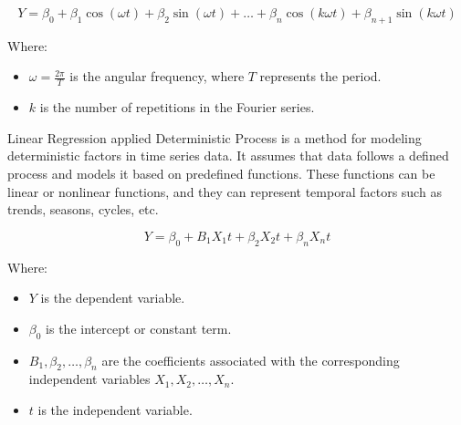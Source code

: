 \documentclass[conference]{IEEEtran}
\begin{document}
\[Y = \beta_0 + \beta_1 \cos(\omega t) + \beta_2 \sin(\omega t) + \ldots + \beta_n \cos(k \omega t) + \beta_{n+1} \sin(k \omega t)\]

Where:
\begin{itemize}
    \item \(\omega = \frac{2\pi}{T}\) is the angular frequency, where \(T\) represents the period.
    \item \(k\) is the number of repetitions in the Fourier series.
\end{itemize}

Linear Regression applied Deterministic Process is a method for modeling deterministic factors in time series data. It assumes that data follows a defined process and models it based on predefined functions. These functions can be linear or nonlinear functions, and they can represent temporal factors such as trends, seasons, cycles, etc.

\[Y = \beta_0 + B_1 X_1 t + \beta_2 X_2 t + \beta_n X_n t\]

Where:
\begin{itemize}
    \item \(Y\) is the dependent variable.
    \item \(\beta_0\) is the intercept or constant term.
    \item \(B_1, \beta_2, \ldots, \beta_n\) are the coefficients associated with the corresponding independent variables \(X_1, X_2, \ldots, X_n\).
    \item \(t\) is the independent variable.
\end{itemize}
\end{document}
